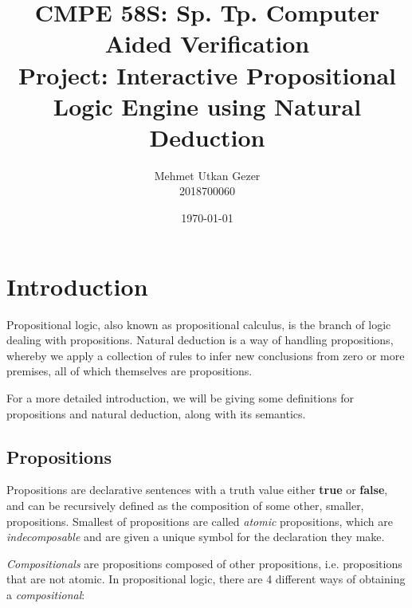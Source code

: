 \documentclass{article}
\title{CMPE 58S: Sp. Tp. Computer Aided Verification \\ Project: Interactive Propositional Logic Engine using Natural Deduction}
\date{\today{}}
\author{Mehmet Utkan Gezer \\ 2018700060}
\newcommand{\true}{\textbf{true}}
\newcommand{\false}{\textbf{false}}
\begin{document}
\maketitle
\pagebreak

\section{Introduction}

Propositional logic, also known as propositional calculus, is the branch
of logic dealing with propositions. Natural deduction is a way of handling
propositions, whereby we apply a collection of rules to infer new
conclusions from zero or more premises, all of which themselves are
propositions.

For a more detailed introduction, we will be giving some definitions for
propositions and natural deduction, along with its semantics.

\subsection{Propositions}\label{sec:intr_prop}

Propositions are declarative
sentences with a truth value either \true{} or \false{},
and can be recursively defined as the composition of
some other, smaller, propositions. Smallest of propositions are
called \textit{atomic} propositions, which are \textit{indecomposable}
and are given a unique symbol for the declaration they make.

\textit{Compositionals} are propositions composed of other propositions,
i.e. propositions that are not atomic. In propositional logic, there
are 4 different ways of obtaining a \textit{compositional}:
\end{document}
